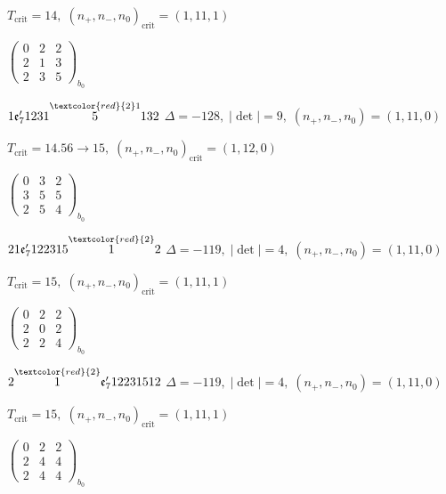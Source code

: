 \documentclass[10pt]{article}
\begin{document}
\hspace{1em}$T_{\text{crit}}=14,\; (n_+,n_-,n_0)_{\text{crit}}=(1,11,1)$

\hspace{2em}$\left(\begin{smallmatrix}0 & 2 & 2 \\ 2 & 1 & 3 \\ 2 & 3 & 5\end{smallmatrix}\right)_{\!b_0}$

\smallskip

$1\mathfrak{e}_7'1231\overset{\textcolor{red}{2}1}{5}132$ \quad $\Delta=-128,\; |\det|=9,\; (n_+,n_-,n_0)=(1,11,0)$

\hspace{1em}$T_{\text{crit}}=14.56 \to 15,\; (n_+,n_-,n_0)_{\text{crit}}=(1,12,0)$

\hspace{2em}$\left(\begin{smallmatrix}0 & 3 & 2 \\ 3 & 5 & 5 \\ 2 & 5 & 4\end{smallmatrix}\right)_{\!b_0}$

\smallskip

$21\mathfrak{e}_7'122315\overset{\textcolor{red}{2}}{1}2$ \quad $\Delta=-119,\; |\det|=4,\; (n_+,n_-,n_0)=(1,11,0)$

\hspace{1em}$T_{\text{crit}}=15,\; (n_+,n_-,n_0)_{\text{crit}}=(1,11,1)$

\hspace{2em}$\left(\begin{smallmatrix}0 & 2 & 2 \\ 2 & 0 & 2 \\ 2 & 2 & 4\end{smallmatrix}\right)_{\!b_0}$

$2\overset{\textcolor{red}{2}}{1}\mathfrak{e}_7'12231512$ \quad $\Delta=-119,\; |\det|=4,\; (n_+,n_-,n_0)=(1,11,0)$

\hspace{1em}$T_{\text{crit}}=15,\; (n_+,n_-,n_0)_{\text{crit}}=(1,11,1)$

\hspace{2em}$\left(\begin{smallmatrix}0 & 2 & 2 \\ 2 & 4 & 4 \\ 2 & 4 & 4\end{smallmatrix}\right)_{\!b_0}$
\end{document}

